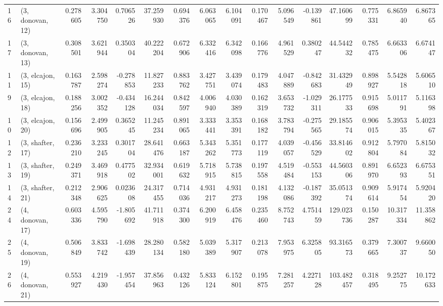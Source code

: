 \begin{tabular}{llrrrrrrrrrrrrrr}
16 &  (3, donovan, 12) &   0.278605 &  3.304750 &  0.706526 &  37.259930 &  0.694376 &   6.063065 &  6.104091 &  0.170467 &   5.096549 & -0.139861 &   47.160699 &  0.775331 &   6.865940 &   6.867365 \\
17 &  (3, donovan, 13) &   0.308501 &  3.621944 &  0.350304 &  40.222204 &  0.672906 &   6.332416 &  6.342098 &  0.166776 &   4.961529 &  0.380247 &   44.544232 &  0.785475 &   6.663306 &   6.674147 \\
11 &  (3, elcajon, 15) &   0.163787 &  2.598274 & -0.278853 &  11.827233 &  0.883762 &   3.427751 &  3.439074 &  0.179483 &   4.047889 & -0.842683 &   31.432949 &  0.898927 &   5.542818 &   5.606510 \\
9  &  (3, elcajon, 18) &   0.188256 &  3.002352 & -0.434128 &  16.244034 &  0.842597 &   4.006940 &  4.030389 &  0.162319 &   3.653732 & -1.029311 &   26.177533 &  0.915698 &   5.011791 &   5.116398 \\
10 &  (3, elcajon, 20) &   0.156696 &  2.499905 &  0.365245 &  11.245234 &  0.891065 &   3.333441 &  3.353391 &  0.168182 &   3.783794 & -0.275565 &   29.185574 &  0.906015 &   5.395335 &   5.402367 \\
12 &  (3, shafter, 17) &   0.236210 &  3.233245 &  0.301704 &  28.641476 &  0.663187 &   5.343262 &  5.351773 &  0.177119 &   4.039057 & -0.456529 &   33.814602 &  0.912804 &   5.797084 &   5.815032 \\
13 &  (3, shafter, 19) &   0.249371 &  3.469918 &  0.477502 &  32.934001 &  0.619632 &   5.718915 &  5.738815 &  0.197558 &   4.519484 & -0.553153 &   44.560306 &  0.891970 &   6.652393 &   6.675351 \\
14 &  (3, shafter, 21) &   0.212348 &  2.906625 &  0.023608 &  24.317455 &  0.714036 &   4.931217 &  4.931273 &  0.181198 &   4.132086 & -0.187392 &   35.051374 &  0.909614 &   5.917454 &   5.920420 \\
24 &  (4, donovan, 17) &   0.603336 &  4.595790 & -1.805692 &  41.711918 &  0.374300 &   6.200919 &  6.458476 &  0.235460 &   8.752743 &  4.751459 &  129.023736 &  0.150287 &  10.317334 &  11.358862 \\
25 &  (4, donovan, 19) &   0.506849 &  3.833742 & -1.698439 &  28.280134 &  0.582180 &   5.039389 &  5.317907 &  0.213078 &   7.953975 &  6.325805 &   93.316573 &  0.379665 &   7.300737 &   9.660050 \\
26 &  (4, donovan, 21) &   0.553927 &  4.219430 & -1.957454 &  37.856963 &  0.432126 &   5.833124 &  6.152801 &  0.195875 &   7.281257 &  4.227128 &  103.482457 &  0.318495 &   9.252775 &  10.172633 \\

\end{tabular}
